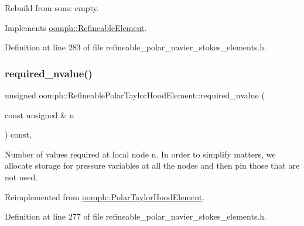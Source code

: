 Rebuild from sons\+: empty. 



Implements \hyperlink{classoomph_1_1RefineableElement_a33324be27833fa4b78279d17158215fa}{oomph\+::\+Refineable\+Element}.



Definition at line 283 of file refineable\+\_\+polar\+\_\+navier\+\_\+stokes\+\_\+elements.\+h.

\mbox{\label{classoomph_1_1RefineablePolarTaylorHoodElement_aa04615fc715f41d0d4e32d6f9b22e444}} 
\subsubsection{\texorpdfstring{required\+\_\+nvalue()}{required\_nvalue()}}
{\footnotesize\ttfamily unsigned oomph\+::\+Refineable\+Polar\+Taylor\+Hood\+Element\+::required\+\_\+nvalue (\begin{DoxyParamCaption}\item[{const unsigned \&}]{n }\end{DoxyParamCaption}) const\hspace{0.3cm}{\ttfamily [inline]}, {\ttfamily [virtual]}}



Number of values required at local node n. In order to simplify matters, we allocate storage for pressure variables at all the nodes and then pin those that are not used. 



Reimplemented from \hyperlink{classoomph_1_1PolarTaylorHoodElement_a471a225bdcb0f6f1babd03f6e152da79}{oomph\+::\+Polar\+Taylor\+Hood\+Element}.



Definition at line 277 of file refineable\+\_\+polar\+\_\+navier\+\_\+stokes\+\_\+elements.\+h.

\mbox{\label{classoomph_1_1RefineablePolarTaylorHoodElement_a08d48de7b56b5412b8e7c5269381b18d}} 
